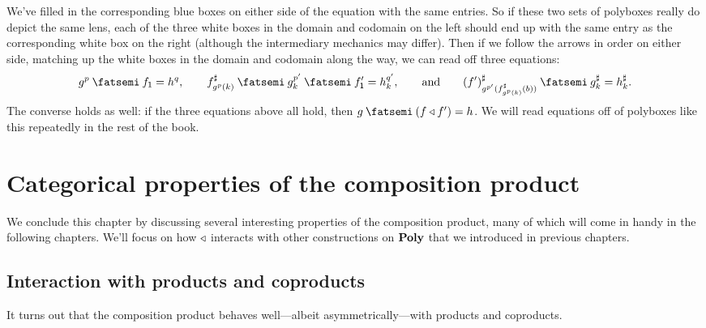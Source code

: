 \documentclass[Book-Poly]{subfiles}
\begin{document}
We've filled in the corresponding blue boxes on either side of the equation with the same entries.
So if these two sets of polyboxes really do depict the same lens, each of the three white boxes in the domain and codomain on the left should end up with the same entry as the corresponding white box on the right (although the intermediary mechanics may differ).
Then if we follow the arrows in order on either side, matching up the white boxes in the domain and codomain along the way, we can read off three equations:
\[
    g^p\then f_\1 = h^q, \qquad f^\sharp_{g^p(k)}\then g^{p'}_k\then f'_\1 = h^{q'}_k, \qqand (f')^\sharp_{g^{p'}(f^\sharp_{g^p(k)}(b))}\then g^\sharp_k = h^\sharp_k.
\]
The converse holds as well: if the three equations above all hold, then $g\then(f\tri f')=h$.
We will read equations off of polyboxes like this repeatedly in the rest of the book.

\section{Categorical properties of the composition product} \label{sec.comon.comp.prop}

We conclude this chapter by discussing several interesting properties of the composition product, many of which will come in handy in the following chapters.
We'll focus on how $\mathbin{\triangleleft}$ interacts with other constructions on $\mathbf{Poly}$ that we introduced in previous chapters.

\subsection{Interaction with products and coproducts} \label{subsec.comon.comp.prop.prod}

It turns out that the composition product behaves well---albeit asymmetrically---with products and coproducts.
\end{document}
